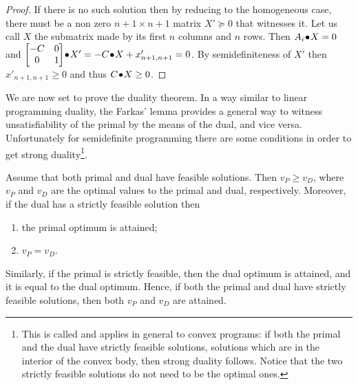 \documentclass[a4paper,twoside,justified]{tufte-handout}
\begin{document}
\begin{proof}
  If there is no such solution then by reducing to the homogeneous
  case, there must be a non zero $ n+1 \times n+1 $ matrix $ X'\succeq
  0 $ that witnesses it. Let us call $X$ the submatrix made by its
  first $n$ columns and $n$ rows. Then $ {A_{i}}\!\bullet\!{X} =0$
  and $ {\begin{bmatrix} -C & 0\\ 0 &
      1\end{bmatrix}}\!\bullet\!{X'} = -{C}\!\bullet\!{X}+x'_{n+1,n+1} = 0
  $. By semidefiniteness of $ X'$ then $ x'_{n+1,n+1}\geq 0$ and thus
  $ {C}\!\bullet\!{X}\geq 0 $.
\end{proof}

We are now set to prove the duality theorem. In a way similar to
linear programming duality, the Farkas' lemma provides a general way
to witness unsatisfiability of the primal by the means of the dual,
and vice versa. Unfortunately for semidefinite programming there are
some conditions in order to get strong duality\footnote{This is called
   and applies in general to convex
  programs: if both the primal and the dual have strictly feasible
  solutions, \ie solutions which are in the interior of the convex
  body, then strong duality follows. Notice that the two strictly
  feasible solutions do not need to be the optimal ones.}.


\begin{theorem}\label{thm:strongduality}
  Assume that both primal and dual have feasible solutions. Then $v_{P}
  \geq v_{D}$, where $v_{P}$ and $ v_{D} $ are the optimal values to
  the primal and dual, respectively. Moreover, if the dual has a
  strictly feasible solution then
  \begin{enumerate}
    \item the primal optimum is attained;
    \item $ v_{P} = v_{D}$.
  \end{enumerate}
  Similarly, if the primal is strictly feasible, then the dual optimum
  is attained, and it is equal to the dual optimum. Hence, if both the
  primal and dual have strictly feasible solutions, then both $v_{P}$
  and $v_{D}$ are attained.
\end{theorem}
\end{document}
